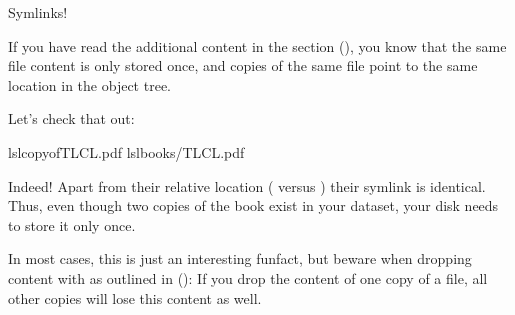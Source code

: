 \ignorespaces \begin{findoutmore}[label={fom-link-copies}, before title={\thetcbcounter\ }, float, floatplacement=tb, check odd page=true]{Symlinks!}
\label{\detokenize{basics/101-136-filesystem:fom-link-copies}}

\sphinxAtStartPar
If you have read the additional content in the section
{\hyperref[\detokenize{basics/101-115-symlinks:symlink}]{}} (), you know that the same file content
is only stored once, and copies of the same file point to
the same location in the object tree.

\sphinxAtStartPar
Let’s check that out:

\begin{sphinxVerbatim}[commandchars=\\\{\}]
ls\PYGZhy{}lcopyofTLCL.pdf
ls\PYGZhy{}lbooks/TLCL.pdf
\end{sphinxVerbatim}

\sphinxAtStartPar
Indeed! Apart from their relative location ( versus
) their symlink is identical. Thus, even though two
copies of the book exist in your dataset, your disk needs to
store it only once.

\sphinxAtStartPar
In most cases, this is just an interesting fun\sphinxhyphen{}fact, but beware
when dropping content with 
as outlined in {\hyperref[\detokenize{basics/101-136-filesystem:remove}]{}} ():
If you drop the content of one copy of a file, all
other copies will lose this content as well.


\end{findoutmore}

